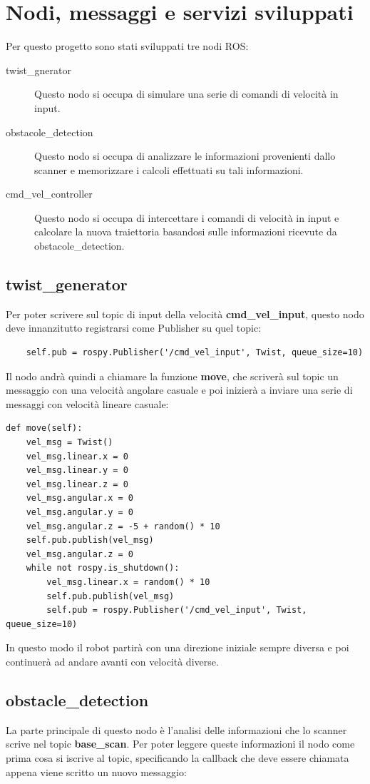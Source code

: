 \documentclass[Lau, binding=0.6cm, oneside]{sapthesis}
\begin{document}
\section{Nodi, messaggi e servizi sviluppati}
Per questo progetto sono stati sviluppati tre nodi ROS:
\begin{description}
	\item[twist\_gnerator] Questo nodo si occupa di simulare una serie di comandi di velocità in input.
	\item[obstacole\_detection] Questo nodo si occupa di analizzare le informazioni provenienti dallo scanner e memorizzare i calcoli effettuati su tali informazioni.
	\item[cmd\_vel\_controller] Questo nodo si occupa di intercettare i comandi di velocità in input e calcolare la nuova traiettoria basandosi sulle informazioni ricevute da obstacole\_detection.
\end{description}

\subsection{twist\_generator}
Per poter scrivere sul topic di input della velocità \textbf{cmd\_vel\_input}, questo nodo deve innanzitutto registrarsi come Publisher su quel topic:

\begin{lstlisting}
	self.pub = rospy.Publisher('/cmd_vel_input', Twist, queue_size=10)
\end{lstlisting}

Il nodo andrà quindi a chiamare la funzione \textbf{move}, che scriverà sul topic un messaggio con una velocità angolare casuale e poi inizierà a inviare una serie di messaggi con velocità lineare casuale:

\begin{lstlisting}
def move(self):
    vel_msg = Twist()
    vel_msg.linear.x = 0
    vel_msg.linear.y = 0
    vel_msg.linear.z = 0
    vel_msg.angular.x = 0
    vel_msg.angular.y = 0
    vel_msg.angular.z = -5 + random() * 10
    self.pub.publish(vel_msg)
    vel_msg.angular.z = 0
    while not rospy.is_shutdown():
        vel_msg.linear.x = random() * 10
        self.pub.publish(vel_msg)
        self.pub = rospy.Publisher('/cmd_vel_input', Twist, queue_size=10)
\end{lstlisting}
In questo modo il robot partirà con una direzione iniziale sempre diversa e poi continuerà ad andare avanti con velocità diverse.

\subsection{obstacle\_detection}
La parte principale di questo nodo è l'analisi delle informazioni che lo scanner scrive nel topic \textbf{base\_scan}.
Per poter leggere queste informazioni il nodo come prima cosa si iscrive al topic, specificando la callback che deve essere chiamata appena viene scritto un nuovo messaggio:
\end{document}
